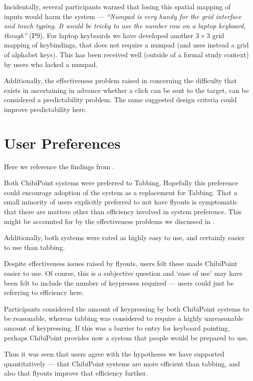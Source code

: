 \documentclass[11pt,openright,a4paper]{report}
\begin{document}
Incidentally, several participants warned that losing this spatial mapping of inputs would harm the system --- \textit{``Numpad is very handy for the grid interface and touch typing. It would be tricky to use the number row on a laptop keyboard, though''} (P9). For laptop keyboards we have developed another $3\times3$ grid mapping of keybindings, that does not require a numpad (and uses instead a grid of alphabet keys). This has been received well (outside of a formal study context) by users who lacked a numpad.

Additionally, the effectiveness problem raised in  concerning the difficulty that exists in ascertaining in advance whether a click can be sent to the target, can be considered a predictability problem. The same suggested design criteria could improve predictability here.

\section{User Preferences}
Here we reference the findings from .

Both ChibiPoint systems were preferred to Tabbing. Hopefully this preference could encourage adoption of the system as a replacement for Tabbing. That a small minority of users explicitly preferred to not have flyouts is symptomatic that there are matters other than efficiency involved in system preference. This might be accounted for by the effectiveness problems we discussed in .

Additionally, both systems were rated as highly easy to use, and certainly easier to use than tabbing.

Despite effectiveness issues raised by flyouts, users felt these made ChibiPoint easier to use. Of course, this is a subjective question and `ease of use' may have been felt to include the number of keypresses required --- users could just be referring to efficiency here.

Participants considered the amount of keypressing by both ChibiPoint systems to be reasonable, whereas tabbing was considered to require a highly unreasonable amount of keypressing. If this was a barrier to entry for keyboard pointing, perhaps ChibiPoint provides now a system that people would be prepared to use.

Thus it was seen that users agree with the hypotheses we have supported quantitatively --- that ChibiPoint systems are more efficient than tabbing, and also that flyouts improve that efficiency further.
\end{document}
